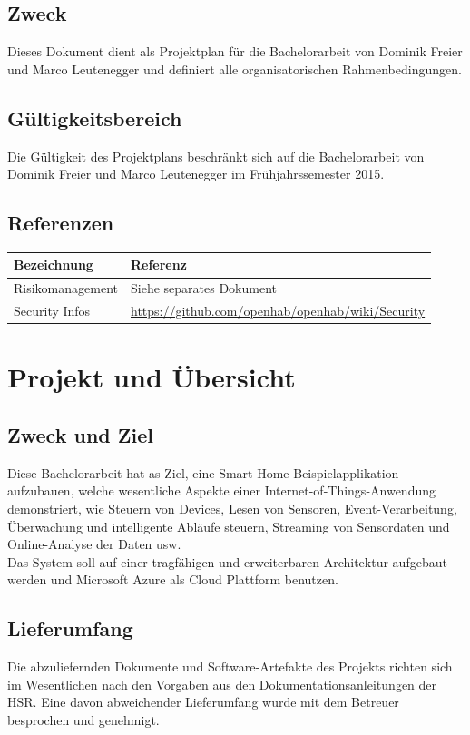 \subsection*{Zweck}
Dieses Dokument dient als Projektplan für die Bachelorarbeit von Dominik Freier und Marco Leutenegger und definiert alle organisatorischen Rahmenbedingungen.

\subsection*{Gültigkeitsbereich}
Die Gültigkeit des Projektplans beschränkt sich auf die Bachelorarbeit von Dominik Freier und Marco Leutenegger im Frühjahrssemester 2015.

\subsection*{Referenzen}
\begin{tabularx}{\textwidth}{lX}
	\textbf{Bezeichnung}	& \textbf{Referenz} \\
	\hline
	Risikomanagement		& Siehe separates Dokument\\
	\hline
	Security Infos		& \url{https://github.com/openhab/openhab/wiki/Security} \\
	\hline
\end{tabularx}
\pagebreak

\section*{Projekt und Übersicht}
\subsection*{Zweck und Ziel}
Diese Bachelorarbeit hat as Ziel, eine Smart-Home Beispielapplikation aufzubauen, welche wesentliche Aspekte einer Internet-of-Things-Anwendung demonstriert, wie Steuern von Devices, Lesen von Sensoren, Event-Verarbeitung, Überwachung und intelligente Abläufe steuern, Streaming von Sensordaten und Online-Analyse der Daten usw. \\
Das System soll auf einer tragfähigen und erweiterbaren Architektur aufgebaut werden und Microsoft Azure als Cloud Plattform benutzen.

\subsection*{Lieferumfang}
Die abzuliefernden Dokumente und Software-Artefakte des Projekts richten sich im Wesentlichen nach den Vorgaben aus den Dokumentationsanleitungen der HSR. Eine davon abweichender Lieferumfang wurde mit dem Betreuer besprochen und genehmigt.

